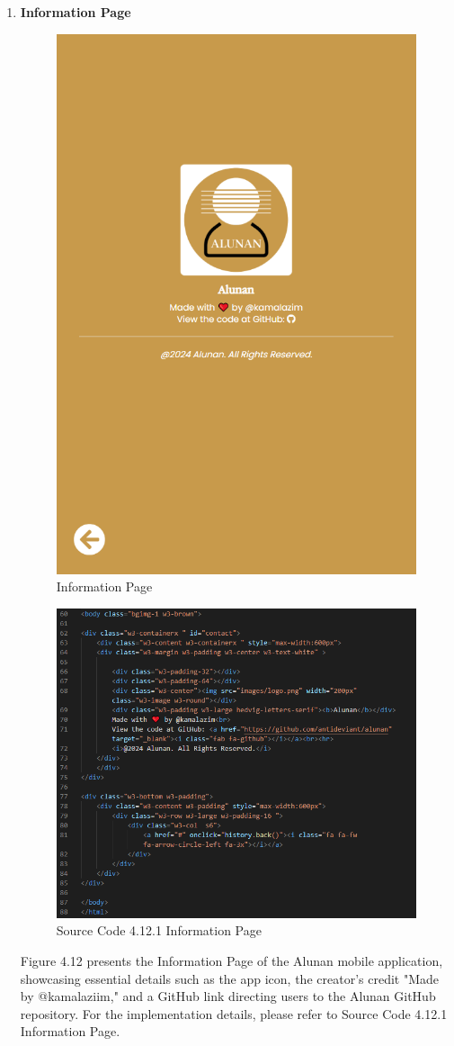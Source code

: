 \begin{enumerate}[1.]
    \item \textbf{Information Page}
    \begin{figure}[h]
        \centering
        \includegraphics[width=0.4\linewidth]{mainmatter/images/frontend/ss/Information Page.png}
        \caption{Information Page}
        \label{fig:myfig51}
    \end{figure}
    \clearpage
    \begin{figure}[h]
        \centering
        \includegraphics[width=0.5\linewidth]{mainmatter/images/frontend/code/info.png}
        \caption*{Source Code 4.12.1 Information Page}
        \label{fig:myfig51a}
    \end{figure}
    Figure 4.12 presents the Information Page of the Alunan mobile application, showcasing essential details such as the app icon, the creator's credit "Made by @kamalaziim," and a GitHub link directing users to the Alunan GitHub repository. For the implementation details, please refer to Source Code 4.12.1 Information Page.


\end{enumerate}
